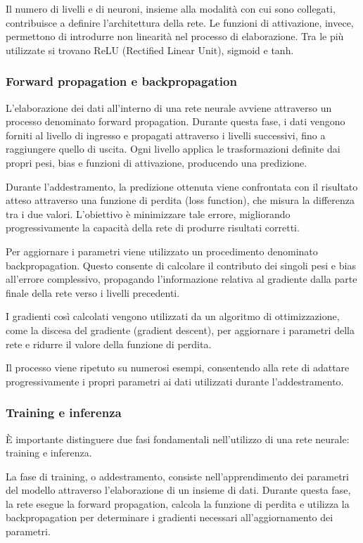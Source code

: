 Il numero di livelli e di neuroni, insieme alla modalità con cui sono collegati, contribuisce a definire l'architettura della rete. Le funzioni di attivazione, invece, permettono di introdurre non linearità nel processo di elaborazione. Tra le più utilizzate si trovano ReLU (Rectified Linear Unit), sigmoid e tanh.

\subsubsection{Forward propagation e backpropagation}

L'elaborazione dei dati all'interno di una rete neurale avviene attraverso un processo denominato forward propagation. Durante questa fase, i dati vengono forniti al livello di ingresso e propagati attraverso i livelli successivi, fino a raggiungere quello di uscita. Ogni livello applica le trasformazioni definite dai propri pesi, bias e funzioni di attivazione, producendo una predizione.

Durante l'addestramento, la predizione ottenuta viene confrontata con il risultato atteso attraverso una funzione di perdita (loss function), che misura la differenza tra i due valori. L'obiettivo è minimizzare tale errore, migliorando progressivamente la capacità della rete di produrre risultati corretti.

Per aggiornare i parametri viene utilizzato un procedimento denominato backpropagation. Questo consente di calcolare il contributo dei singoli pesi e bias all'errore complessivo, propagando l'informazione relativa al gradiente dalla parte finale della rete verso i livelli precedenti.

I gradienti così calcolati vengono utilizzati da un algoritmo di ottimizzazione, come la discesa del gradiente (gradient descent), per aggiornare i parametri della rete e ridurre il valore della funzione di perdita.

Il processo viene ripetuto su numerosi esempi, consentendo alla rete di adattare progressivamente i propri parametri ai dati utilizzati durante l'addestramento.

\subsubsection{Training e inferenza}

È importante distinguere due fasi fondamentali nell'utilizzo di una rete neurale: training e inferenza.

La fase di training, o addestramento, consiste nell'apprendimento dei parametri del modello attraverso l'elaborazione di un insieme di dati. Durante questa fase, la rete esegue la forward propagation, calcola la funzione di perdita e utilizza la backpropagation per determinare i gradienti necessari all'aggiornamento dei parametri.

